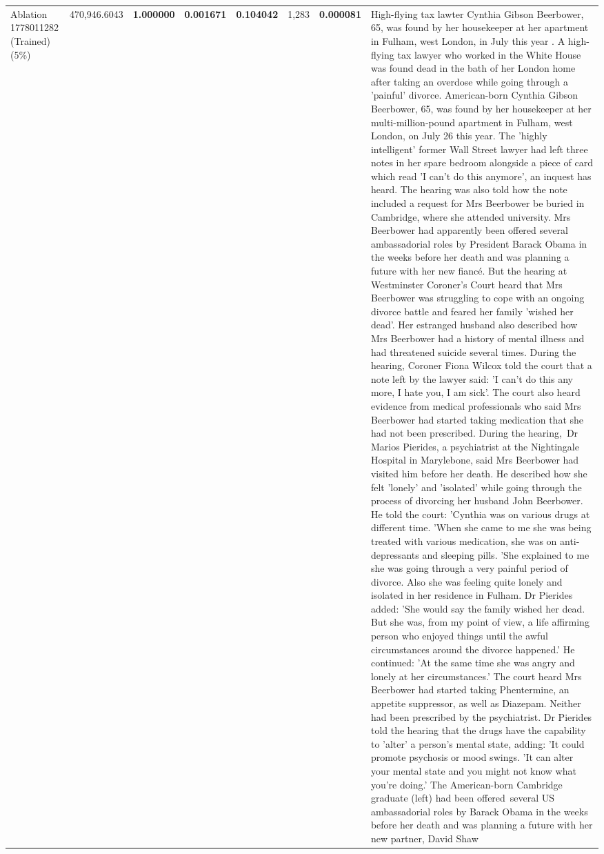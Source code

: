 \begin{table}[H]
\begin{tabular}{llrlllll}
 \\
Ablation 1778011282 (Trained) (5\%) & \color{red} 470,946.6043 & \bfseries \color{red} 1.000000 & \bfseries \color{red} 0.001671 & \bfseries \color{red} 0.104042 & \color{red} 1,283 & \bfseries \color{red} 0.000081 & High-flying tax lawter Cynthia Gibson Beerbower, 65, was found by her housekeeper at her apartment in Fulham, west London, in July this year . A high-flying tax lawyer who worked in the White House was found dead in the bath of her London home after taking an overdose while going through a 'painful' divorce. American-born Cynthia Gibson Beerbower, 65, was found by her housekeeper at her multi-million-pound apartment in Fulham, west London, on July 26 this year. The 'highly intelligent' former Wall Street lawyer had left three notes in her spare bedroom alongside a piece of card which read 'I can't do this anymore', an inquest has heard. The hearing was also told how the note included a request for Mrs Beerbower be buried in Cambridge, where she attended university. Mrs Beerbower had apparently been offered several ambassadorial roles by President Barack Obama in the weeks before her death and was planning a future with her new fiancé. But the hearing at Westminster Coroner's Court heard that Mrs Beerbower was struggling to cope with an ongoing divorce battle and feared her family 'wished her dead'. Her estranged husband also described how Mrs Beerbower had a history of mental illness and had threatened suicide several times. During the hearing, Coroner Fiona Wilcox told the court that a note left by the lawyer said: 'I can't do this any more, I hate you, I am sick'. The court also heard evidence from medical professionals who said Mrs Beerbower had started taking medication that she had not been prescribed. During the hearing, Dr Marios Pierides, a psychiatrist at the Nightingale Hospital in Marylebone, said Mrs Beerbower had visited him before her death. He described how she felt 'lonely' and 'isolated' while going through the process of divorcing her husband John Beerbower. He told the court: 'Cynthia was on various drugs at different time. 'When she came to me she was being treated with various medication, she was on anti-depressants and sleeping pills. 'She explained to me she was going through a very painful period of divorce. Also she was feeling quite lonely and isolated in her residence in Fulham. Dr Pierides added: 'She would say the family wished her dead. But she was, from my point of view, a life affirming person who enjoyed things until the awful circumstances around the divorce happened.' He continued: 'At the same time she was angry and lonely at her circumstances.' The court heard Mrs Beerbower had started taking Phentermine, an appetite suppressor, as well as Diazepam. Neither had been prescribed by the psychiatrist. Dr Pierides told the hearing that the drugs have the capability to 'alter' a person's mental state, adding: 'It could promote psychosis or mood swings. 'It can alter your mental state and you might not know what you're doing.' The American-born Cambridge graduate (left) had been offered several US ambassadorial roles by Barack Obama in the weeks before her death and was planning a future with her new partner, David Shaw 
\end{tabular}
\end{table}
